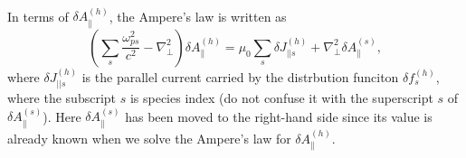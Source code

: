 \documentclass{article}
\begin{document}
\

In terms of $\delta A_{\parallel}^{(h)}$, the Ampere's law is written as
\begin{equation}
  \label{23-12-4-1} \left( \sum_s \frac{\omega_{p s}^2}{c^2} -
  \nabla^2_{\perp} \right) \delta A_{\parallel}^{(h)} = \mu_0  \sum_s \delta
  J_{|| s}^{(h)} + \nabla^2_{\perp} \delta A_{\parallel}^{(s)},
\end{equation}
where $\delta J_{|| s}^{(h)}$ is the parallel current carried by the
distrbution funciton $\delta f^{(h)}_s$, where the subscript $s$ is species
index (do not confuse it with the superscript $s$ of $\delta
A_{\parallel}^{(s)}$). Here $\delta A_{\parallel}^{(s)}$ has been moved to the
right-hand side since its value is already known when we solve the Ampere's
law for $\delta A_{\parallel}^{(h)}$.
\end{document}
